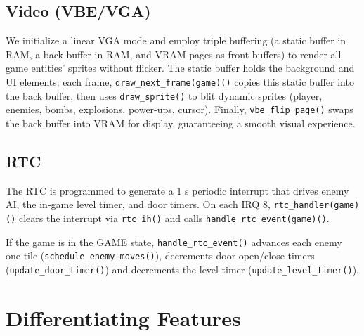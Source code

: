 \documentclass[12pt,a4paper]{article}
\newcommand{\func}[1]{\texttt{#1()}}
\begin{document}
\subsection{Video (VBE/VGA)}

We initialize a linear VGA mode and employ triple buffering (a static buffer in RAM, a back buffer in RAM, and VRAM pages as front buffers) to render all game entities' sprites without flicker. The static buffer holds the background and UI elements; each frame, \func{draw\_next\_frame(game)} copies this static buffer into the back buffer, then uses \func{draw\_sprite} to blit dynamic sprites (player, enemies, bombs, explosions, power-ups, cursor). Finally, \func{vbe\_flip\_page} swaps the back buffer into VRAM for display, guaranteeing a smooth visual experience.

\subsection{RTC}

The RTC is programmed to generate a 1 s periodic interrupt that drives enemy AI, the in-game level timer, and door timers. On each IRQ 8, \func{rtc\_handler(game)} clears the interrupt via \func{rtc\_ih} and calls \func{handle\_rtc\_event(game)}.

If the game is in the GAME state, \func{handle\_rtc\_event} advances each enemy one tile (\func{schedule\_enemy\_moves}), decrements door open/close timers (\func{update\_door\_timer}) and decrements the level timer (\func{update\_level\_timer}).

\section{Differentiating Features}
\end{document}
